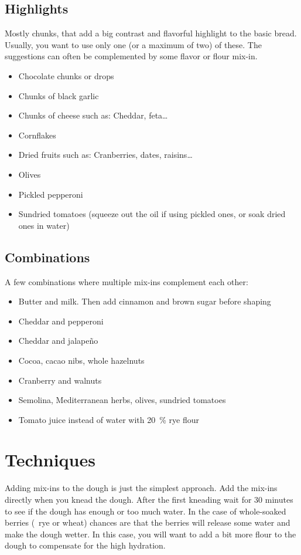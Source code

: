 \subsection{Highlights}
Mostly chunks, that add a big contrast and flavorful highlight to the basic
bread. Usually, you want to use only one (or a maximum of two) of these. The suggestions
can often be complemented by some flavor or flour mix-in.

\begin{itemize}
  \item Chocolate chunks or drops
  \item Chunks of black garlic
  \item Chunks of cheese such as: Cheddar, feta\dots{}
  \item Cornflakes
  \item Dried fruits such as: Cranberries, dates, raisins\dots{}
  \item Olives
  \item Pickled pepperoni
  \item Sundried tomatoes (squeeze out the oil if using pickled ones, or soak
      dried ones in water)
\end{itemize}

\subsection{Combinations}
A few combinations where multiple mix-ins complement each other:

\begin{itemize}
  \item Butter and milk. Then add cinnamon and brown sugar before shaping
  \item Cheddar and pepperoni
  \item Cheddar and jalapeño
  \item Cocoa, cacao nibs, whole hazelnuts
  \item Cranberry and walnuts
  \item Semolina, Mediterranean herbs, olives, sundried tomatoes
  \item Tomato juice instead of water with \qty{20}{\percent} rye flour
\end{itemize}

\section{Techniques}

Adding mix-ins to the dough is just the simplest approach. Add the mix-ins
directly when you knead the dough. After the first kneading wait for 30 minutes to see
if the dough has enough or too much water. In the case of whole-soaked berries
(\eg~rye or wheat) chances are that the berries will release some water and make the dough
wetter. In this case, you will want to add a bit more flour to the dough to
compensate for the high hydration.

